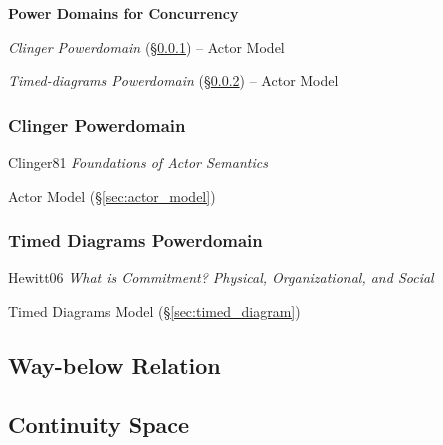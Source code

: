 \textbf{Power Domains for Concurrency}

\emph{Clinger Powerdomain} (\S\ref{sec:clinger_powerdomain}) -- Actor
Model

\emph{Timed-diagrams Powerdomain}
(\S\ref{sec:timed_diagrams_powerdomain}) -- Actor Model



\subsubsection{Clinger Powerdomain}\label{sec:clinger_powerdomain}

Clinger81 \emph{Foundations of Actor Semantics}

\fist Actor Model (\S\ref{sec:actor_model})



\subsubsection{Timed Diagrams Powerdomain}
\label{sec:timed_diagrams_powerdomain}

Hewitt06 \emph{What is Commitment? Physical, Organizational, and
  Social}

\fist Timed Diagrams Model (\S\ref{sec:timed_diagram})



\subsection{Way-below Relation}\label{sec:waybelow_relation}

\subsection{Continuity Space}\label{sec:continuity_space}

